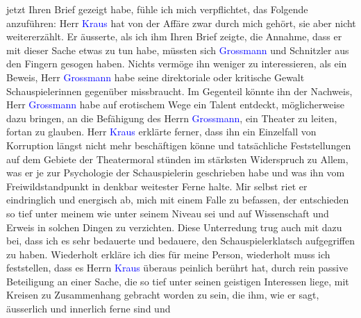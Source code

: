                     jetzt Ihren Brief gezeigt habe, fühle ich mich verpflichtet, das Folgende
                    anzuführen: Herr \textcolor{blue}{Kraus}{}\ledrightnote{\textcolor{blue}{Karl Kraus}} hat von der Affäre
                    zwar durch mich gehört, sie aber nicht weitererzählt. Er äusserte, als ich ihm
                    Ihren Brief zeigte, die Annahme, dass er mit dieser Sache etwas zu tun habe,
                    müssten sich \textcolor{blue}{Grossmann}{}\ledrightnote{\textcolor{blue}{Stefan Großmann}} und Schnitzler aus
                    den Fingern gesogen haben. Nichts vermöge ihn weniger zu interessieren, als ein
                    Beweis, Herr \textcolor{blue}{Grossmann}{}\ledrightnote{\textcolor{blue}{Stefan Großmann}} habe seine
                    direktoriale oder kritische Gewalt Schauspielerinnen gegenüber missbraucht. Im
                    Gegenteil könnte ihn der Nachweis, Herr \textcolor{blue}{Grossmann}{}\ledrightnote{\textcolor{blue}{Stefan Großmann}} habe auf erotischem Wege ein Talent entdeckt, möglicherweise
                    dazu bringen, an die Befähigung des Herrn \textcolor{blue}{Grossmann}{}\ledrightnote{\textcolor{blue}{Stefan Großmann}}, ein Theater zu leiten, fortan zu glauben. Herr \textcolor{blue}{Kraus}{}\ledrightnote{\textcolor{blue}{Karl Kraus}} erklärte ferner, dass ihn ein
                    Einzelfall von Korruption längst nicht mehr beschäftigen könne und tatsäch{\pb}liche Feststellungen auf dem Gebiete der
                    Theatermoral stünden im stärksten Widerspruch zu Allem, was er je zur
                    Psychologie der Schauspielerin geschrieben habe und was ihn vom
                    Freiwildstandpunkt in denkbar weitester Ferne halte. Mir selbst riet er
                    eindringlich und energisch ab, mich mit einem Falle zu befassen, der entschieden
                    so tief unter meinem wie unter seinem Niveau sei und auf Wissenschaft und Erweis
                    in solchen Dingen zu verzichten. Diese Unterredung trug auch mit dazu bei, dass
                    ich es sehr bedauerte und bedauere, den Schauspielerklatsch aufgegriffen zu
                    haben. Wiederholt erkläre ich dies für meine Person, wiederholt muss ich
                    feststellen, dass es Herrn \textcolor{blue}{Kraus}{}\ledrightnote{\textcolor{blue}{Karl Kraus}} überaus
                    peinlich berührt hat, durch rein passive Beteiligung an einer Sache, die so tief
                    unter seinen geistigen Interessen liege, mit Kreisen zu Zusammenhang gebracht
                    worden zu sein, die ihm, wie er sagt, äusserlich und innerlich ferne sind und
